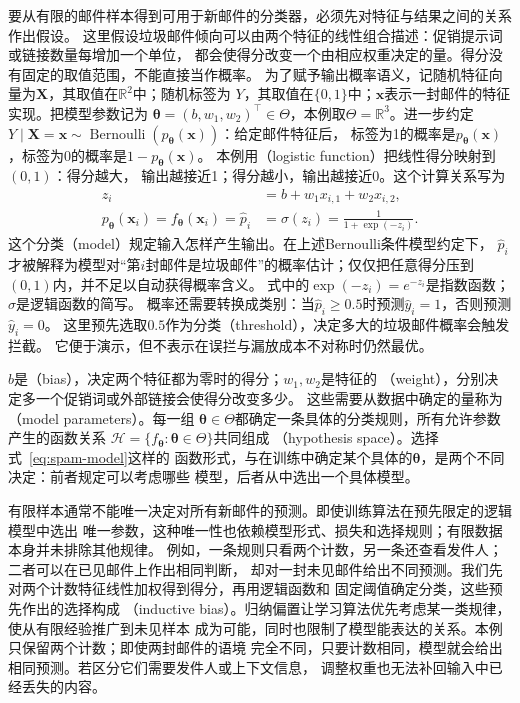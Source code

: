 要从有限的邮件样本得到可用于新邮件的分类器，必须先对特征与结果之间的关系作出假设。
这里假设垃圾邮件倾向可以由两个特征的线性组合描述：促销提示词或链接数量每增加一个单位，
都会使得分改变一个由相应权重决定的量。得分没有固定的取值范围，不能直接当作概率。
为了赋予输出概率语义，记随机特征向量为$\bm{X}$，其取值在$\mathbb{R}^2$中；随机标签为
$Y$，其取值在$\{0,1\}$中；$\bm{x}$表示一封邮件的特征实现。把模型参数记为
$\bm{\theta}=(b,w_1,w_2)^{\top}\in\Theta$，本例取$\Theta=\mathbb{R}^3$。进一步约定
$Y\mid\bm{X}=\bm{x}\sim\operatorname{Bernoulli}(p_{\bm{\theta}}(\bm{x}))$：给定邮件特征后，
标签为1的概率是$p_{\bm{\theta}}(\bm{x})$，标签为0的概率是$1-p_{\bm{\theta}}(\bm{x})$。
本例用（logistic function）把线性得分映射到$(0,1)$：得分越大，
输出越接近1；得分越小，输出越接近0。这个计算关系写为
\begin{align}
  z_i &= b+w_1x_{i,1}+w_2x_{i,2}, \\
  p_{\bm{\theta}}(\bm{x}_i)
  =f_{\bm{\theta}}(\bm{x}_i)
  =\hat{p}_i
  &=\sigma(z_i)=\frac{1}{1+\exp(-z_i)}.
  \label{eq:spam-model}
\end{align}
这个分类（model）规定输入怎样产生输出。在上述Bernoulli条件模型约定下，
$\hat{p}_i$才被解释为模型对“第$i$封邮件是垃圾邮件”的概率估计；仅仅把任意得分压到
$(0,1)$内，并不足以自动获得概率含义。
式中的$\exp(-z_i)=e^{-z_i}$是指数函数；$\sigma$是逻辑函数的简写。
概率还需要转换成类别：当$\hat{p}_i\geq 0.5$时预测$\hat{y}_i=1$，否则预测$\hat{y}_i=0$。
这里预先选取$0.5$作为分类（threshold），决定多大的垃圾邮件概率会触发拦截。
它便于演示，但不表示在误拦与漏放成本不对称时仍然最优。

$b$是（bias），决定两个特征都为零时的得分；$w_1,w_2$是特征的
（weight），分别决定多一个促销词或外部链接会使得分改变多少。
这些需要从数据中确定的量称为（model parameters）。每一组
$\bm{\theta}\in\Theta$都确定一条具体的分类规则，所有允许参数产生的函数关系
$\mathcal H=\{f_{\bm{\theta}}:\bm{\theta}\in\Theta\}$共同组成
（hypothesis space）。选择式~\eqref{eq:spam-model}这样的
函数形式，与在训练中确定某个具体的$\bm{\theta}$，是两个不同决定：前者规定可以考虑哪些
模型，后者从中选出一个具体模型。

有限样本通常不能唯一决定对所有新邮件的预测。即使训练算法在预先限定的逻辑模型中选出
唯一参数，这种唯一性也依赖模型形式、损失和选择规则；有限数据本身并未排除其他规律。
例如，一条规则只看两个计数，另一条还查看发件人；二者可以在已见邮件上作出相同判断，
却对一封未见邮件给出不同预测。我们先对两个计数特征线性加权得到得分，再用逻辑函数和
固定阈值确定分类，这些预先作出的选择构成
（inductive bias）。归纳偏置让学习算法优先考虑某一类规律，使从有限经验推广到未见样本
成为可能，同时也限制了模型能表达的关系。本例只保留两个计数；即使两封邮件的语境
完全不同，只要计数相同，模型就会给出相同预测。若区分它们需要发件人或上下文信息，
调整权重也无法补回输入中已经丢失的内容。

